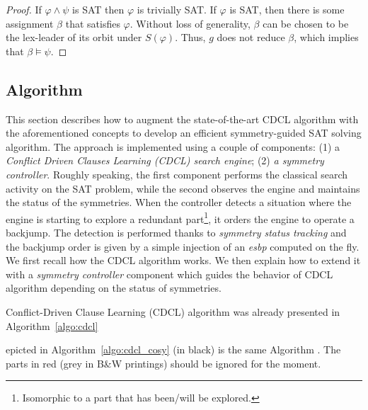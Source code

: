 \begin{proof}
	
	If $\varphi \wedge \psi$ is SAT then $\varphi$ is trivially SAT. If
	$\varphi$ is SAT, then there is some assignment $\beta$ that satisfies $\varphi$.
	Without loss of generality, $\beta$ can be chosen to be the lex-leader of its
	orbit under $S(\varphi)$. Thus, $g$ does not reduce $\beta$, which implies that
	$\beta \models \psi$.
	
\end{proof}




\subsection{Algorithm}


This section describes how to augment the state-of-the-art CDCL algorithm with
the aforementioned concepts to develop an efficient symmetry-guided SAT
solving algorithm. 
The approach is implemented using a couple of components: (1) a
\textit{Conflict Driven Clauses Learning (CDCL) search engine}; (2) \textit{a
	symmetry controller}. Roughly speaking, the first component performs the
classical search activity on the SAT problem, while the second observes the
engine and maintains the status of the symmetries. When the controller detects
a situation where the engine is starting to explore a redundant
part\footnote{Isomorphic to a part that has been/will be explored.}, it orders
the engine to operate a backjump. The detection is performed thanks to
\emph{symmetry status tracking} and the backjump order is given by a simple
injection of an \emph{esbp} computed on the fly.
We first recall how the CDCL algorithm works. We then
explain how to extend it with a \emph{symmetry controller} component which
guides the behavior of CDCL algorithm depending on the status of symmetries.




Conflict-Driven Clause Learning (CDCL) algorithm was already presented in Algorithm~\ref{algo:cdcl}


epicted in
Algorithm~\ref{algo:cdcl_cosy} (in black) is the same Algorithm . The parts in red (grey in B\&W printings) should be
ignored for the moment.




